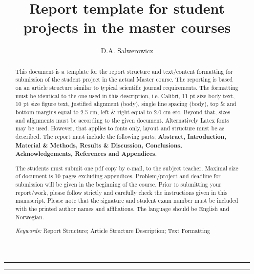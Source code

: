 \documentclass[a4paper,12pt]{extarticle}
\title{Report template for student projects in the master courses}
\author{D.A. Salwerowicz}
\date{\parbox{\linewidth}{\centering
    \textit{\small UiT - The Arctic University of Norway, P.O. Box 385, N-8505 Narvik, Norway}\endgraf\bigskip
    \small Submitted \today
}}
\providecommand{\keywords}[1]{\flushleft\textit{\small{Keywords:}} #1}
\begin{document}
  
\maketitle

\noindent\rule{\linewidth}{.5pt}
\begin{abstract} 
This document is a template for the report structure and text/content formatting for submission of the student project in the actual Master course. The reporting is based on an article structure similar to typical scientific journal requirements. The formatting must be identical to the one used in this description, i.e. Calibri, 11 pt size body text, 10 pt size figure text, justified alignment (body), single line spacing (body), top \& and bottom margins equal to 2.5 cm, left \& right equal to 2.0 cm etc. Beyond that, sizes and alignments must be according to the given document. Alternatively Latex fonts may be used. However, that applies to fonts only, layout and structure must be as described. The report must include the following parts; \textbf{Abstract, Introduction, Material \& Methods, Results \& Discussion, Conclusions, Acknowledgements, References and Appendices}.

The students must submit one pdf copy by e-mail, to the subject teacher. Maximal size of document is 10 pages excluding appendices. Problem/project and deadline for submission will be given in the beginning of the course. Prior to submitting your report/work, please follow strictly and carefully check the instructions given in this manuscript. Please note that the signature and student exam number must be included with the printed author names and affiliations. The language should be English and Norwegian.

\keywords{\small{Report Structure}; \small{Article Structure Description}; \small{Text Formatting}}
\end{abstract}
\rule{\linewidth}{.5pt}

\end{document}
